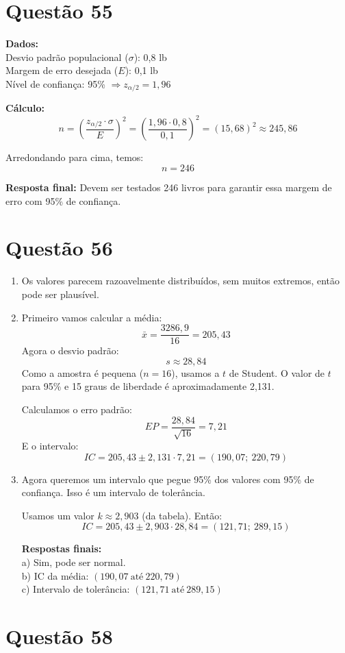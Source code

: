 \documentclass[12pt]{article}
\newcommand{\quest}[1]{\section*{Questão #1}} %
\begin{document}
\quest{55}

\textbf{Dados:}\\
Desvio padrão populacional ($\sigma$): 0,8 lb\\
Margem de erro desejada ($E$): 0,1 lb\\
Nível de confiança: 95\% $\Rightarrow z_{\alpha/2} = 1{,}96$

\textbf{Cálculo:}
\[
    n = \left( \frac{z_{\alpha/2} \cdot \sigma}{E} \right)^2 = \left( \frac{1{,}96 \cdot 0{,}8}{0{,}1} \right)^2 = (15{,}68)^2 \approx 245{,}86
\]

Arredondando para cima, temos:
\[
    \boxed{n = 246}
\]

\textbf{Resposta final:} Devem ser testados 246 livros para garantir essa margem de erro com 95\% de confiança.

\quest{56}

\begin{enumerate}
    \item Os valores parecem razoavelmente distribuídos, sem muitos extremos, então pode ser plausível.

    \item Primeiro vamos calcular a média:
    \[ 
    \bar{x} = \frac{3286{,}9}{16} = 205{,}43
    \]
    Agora o desvio padrão:
    \[ 
    s \approx 28{,}84
    \]
    Como a amostra é pequena ($n=16$), usamos a $t$ de Student. O valor de $t$ para 95\% e 15 graus de liberdade é aproximadamente 2{,}131.

    Calculamos o erro padrão:
    \[ 
    EP = \frac{28{,}84}{\sqrt{16}} = 7{,}21
    \]
    E o intervalo:
    \[ 
    IC = 205{,}43 \pm 2{,}131 \cdot 7{,}21 = (190{,}07;\ 220{,}79)
    \]

    \item Agora queremos um intervalo que pegue 95\% dos valores com 95\% de confiança. Isso é um intervalo de tolerância.

    Usamos um valor $k \approx 2{,}903$ (da tabela). Então:
    \[ 
    IC = 205{,}43 \pm 2{,}903 \cdot 28{,}84 = (121{,}71;\ 289{,}15)
    \]

    \textbf{Respostas finais:}\\
    a) Sim, pode ser normal.\\
    b) IC da média: $\boxed{(190{,}07\ \text{até}\ 220{,}79)}$\\
    c) Intervalo de tolerância: $\boxed{(121{,}71\ \text{até}\ 289{,}15)}$
\end{enumerate}

\quest{58}
\end{document}
